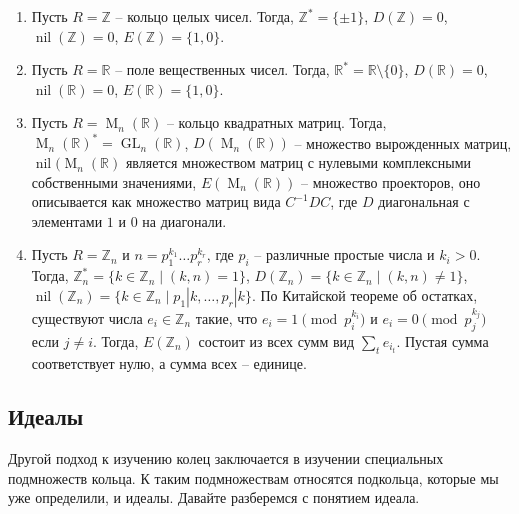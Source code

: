\begin{examples}
\begin{enumerate}
\item Пусть $R = \mathbb Z$ -- кольцо целых чисел.
Тогда, $\mathbb Z^* = \{\pm 1\}$, $D(\mathbb Z) = 0$, $\operatorname{nil}(\mathbb Z) =  0$, $E(\mathbb Z) = \{1, 0\}$.

\item Пусть $R = \mathbb R$ -- поле вещественных чисел.
Тогда, $\mathbb R^* = \mathbb R\setminus\{0\}$, $D(\mathbb R) = 0$, $\operatorname{nil}(\mathbb R) = 0$, $E(\mathbb R) = \{1, 0\}$.

\item Пусть $R = \operatorname{M}_n(\mathbb R)$ -- кольцо квадратных матриц.
Тогда, $\operatorname{M}_n(\mathbb R)^* = \operatorname{GL}_n(\mathbb R)$, $D(\operatorname{M}_n(\mathbb R))$ -- множество вырожденных матриц, $\operatorname{nil}(\operatorname{M}_n(\mathbb R)$ является множеством матриц с нулевыми комплексными собственными значениями, $E(\operatorname{M}_n(\mathbb R))$ -- множество проекторов, оно описывается как множество матриц вида $C^{-1}DC$, где $D$ диагональная с элементами $1$ и $0$ на диагонали.

\item Пусть $R = \mathbb Z_n$ и $n = p_1^{k_1}\ldots p_r^{k_r}$, где $p_i$ -- различные простые числа и $k_i > 0$.
Тогда, $\mathbb Z_n^* = \{k\in \mathbb Z_n\mid (k, n) = 1\}$, $D(\mathbb Z_n) = \{k\in \mathbb Z_n\mid (k, n) \neq 1\}$, $\operatorname{nil}(\mathbb Z_n) = \{k\in \mathbb Z_n\mid p_1|k,\ldots,p_r|k\}$.
По Китайской теореме об остатках, существуют числа $e_i\in \mathbb Z_n$ такие, что $e_i = 1 \pmod{p_i^{k_i}}$ и $e_i = 0\pmod{p_j^{k_j}}$ если $j\neq i$.
Тогда, $E(\mathbb Z_n)$ состоит из всех сумм вид $\sum_{t} e_{i_t}$.
Пустая сумма соответствует нулю, а сумма всех -- единице.
\end{enumerate}
\end{examples}

\subsection{Идеалы}

Другой подход к изучению колец заключается в изучении специальных подмножеств кольца.
К таким подмножествам относятся подкольца, которые мы уже определили, и идеалы.
Давайте разберемся с понятием идеала.

